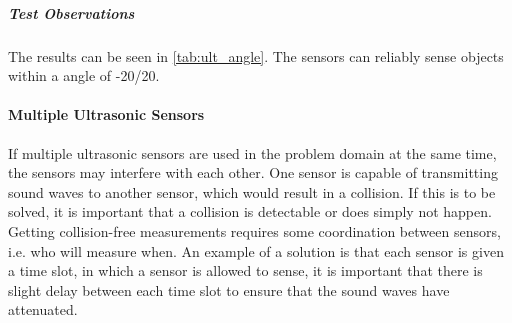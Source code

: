 \subparagraph{Test Observations}
The results can be seen in \cref{tab:ult_angle}. The sensors can reliably sense objects within a angle of -20\degree/20\degree.

\paragraph{Multiple Ultrasonic Sensors}
If multiple ultrasonic sensors are used in the problem domain at the same time, the sensors may interfere with each other. One sensor is capable of transmitting sound waves to another sensor, which would result in a collision. If this is to be solved, it is important that a collision is detectable or does simply not happen. Getting collision-free measurements requires some coordination between sensors, i.e. who will measure when. An example of a solution is that each sensor is given a time slot, in which a sensor is allowed to sense, it is important that there is slight delay between each time slot to ensure that the sound waves have attenuated.
